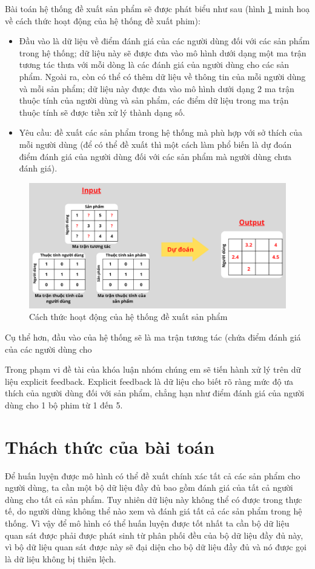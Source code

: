 Bài toán hệ thống đề xuất sản phẩm sẽ được phát biểu như sau (hình \ref{fig:chap1_rs} minh hoạ về cách thức hoạt động của hệ thống đề xuất phim):
\begin{itemize}
    \item Đầu vào là dữ liệu về điểm đánh giá của các người dùng đối với các sản phẩm trong hệ thống; dữ liệu này sẽ được đưa vào mô hình dưới dạng một ma trận tương tác thưa với mỗi dòng là các đánh giá của người dùng cho các sản phẩm. Ngoài ra, còn có thể có thêm dữ liệu về thông tin của mỗi người dùng và mỗi sản phẩm; dữ liệu này được đưa vào mô hình dưới dạng 2 ma trận thuộc tính của người dùng và sản phẩm, các điểm dữ liệu trong ma trận thuộc tính sẽ được tiền xử lý thành dạng số.

    \item Yêu cầu: đề xuất các sản phẩm trong hệ thống mà phù hợp với sở thích của mỗi người dùng (để có thể đề xuất thì một cách làm phổ biến là dự đoán điểm đánh giá của người dùng đối với các sản phẩm mà người dùng chưa đánh giá).
\end{itemize}

\begin{figure}[h]
    \centering
    \includegraphics[width=\textwidth]{images/Chapter1/rs.png}
    \caption{Cách thức hoạt động của hệ thống đề xuất sản phẩm}
    \label{fig:chap1_rs}
\end{figure}

Cụ thể hơn, đầu vào của hệ thống sẽ là ma trận tương tác (chứa điểm đánh giá của các người dùng cho

Trong phạm vi đề tài của khóa luận nhóm chúng em sẽ tiến hành xử lý trên dữ liệu explicit feedback. Explicit feedback là dữ liệu cho biết rõ ràng mức độ ưa thích của người dùng đối với sản phẩm, chẳng hạn như điểm đánh giá của người dùng cho 1 bộ phim từ 1 đến 5. 


\section{Thách thức của bài toán}
Để huấn luyện được mô hình có thể đề xuất chính xác tất cả các sản phẩm cho người dùng, ta cần một bộ dữ liệu đầy đủ bao gồm đánh giá của tất cả người dùng cho tất cả sản phẩm. Tuy nhiên dữ liệu này không thể có được trong thực tế, do người dùng không thể nào xem và đánh giá tất cả các sản phẩm trong hệ thống. Vì vậy để mô hình có thể huấn luyện được tốt nhất ta cần bộ dữ liệu quan sát được phải được phát sinh từ phân phối đều của bộ dữ liệu đầy đủ này, vì bộ dữ liệu quan sát được này sẽ đại diện cho bộ dữ liệu đầy đủ và nó được gọi là dữ liệu không bị thiên lệch. 

